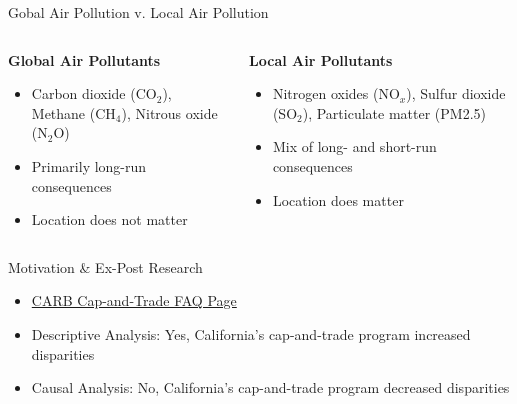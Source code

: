 \documentclass[11pt, aspectratio = 169]{beamer}
\begin{document}
\begin{frame}{Gobal Air Pollution v. Local Air Pollution}
    
    \begin{columns}
    \begin{column}{0.5\textwidth}
        \textbf{Global Air Pollutants}
        \vspace*{1em}
        \begin{itemize}
            \item Carbon dioxide (CO$_2$), Methane (CH$_4$), Nitrous oxide (N$_2$O)
            \vspace*{2em}
            \item Primarily long-run consequences
            \vspace*{2em}
            \item Location does not matter
        \end{itemize}
    \end{column}
    \begin{column}{0.5\textwidth}
        \textbf{Local Air Pollutants}
        \vspace*{1em}
        \begin{itemize}
            \item Nitrogen oxides (NO$_x$), Sulfur dioxide (SO$_2$), Particulate matter (PM2.5)
            \vspace*{1em}
            \item Mix of long- and short-run consequences
            \vspace*{1em}
            \item Location does matter
        \end{itemize}
    \end{column}
    \end{columns}
    
\end{frame}
    

\begin{frame}{Motivation \& Ex-Post Research}
    
    \begin{itemize}
        \item \href{https://ww2.arb.ca.gov/resources/documents/faq-cap-and-trade-program}{CARB Cap-and-Trade FAQ Page} 
        \vfill 
        \item Descriptive Analysis: Yes, California's cap-and-trade program increased disparities \citep{cushing2018carbon, pastor2022up}
        \vfill
        \item Causal Analysis: No, California's cap-and-trade program decreased disparities \citep{hernandez2023environmental}
    \end{itemize}

\end{frame}
\end{document}
